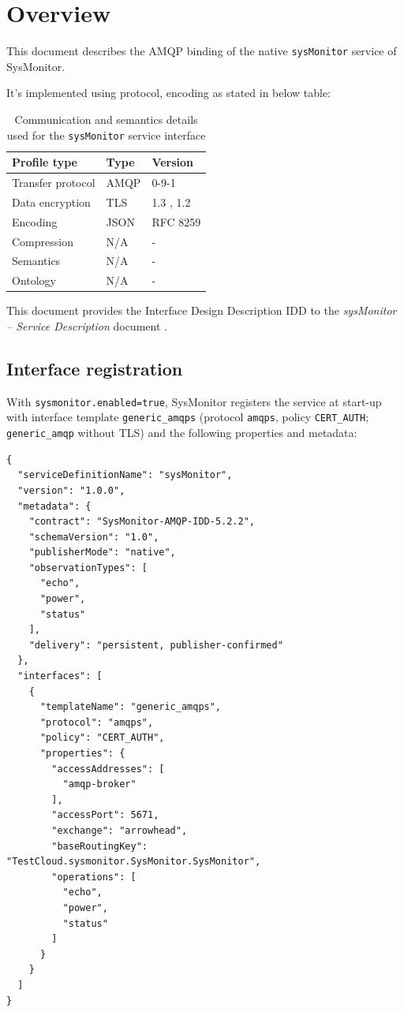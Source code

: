 \documentclass[a4paper]{arrowhead}
\begin{document}
\section{Overview}
\label{sec:overview}

This document describes the AMQP binding of the native \texttt{sysMonitor} service of SysMonitor.

It's implemented using protocol, encoding as stated in below table:
\begin{table}[ht!]
  \centering
  \begin{tabular}{|l|l|l|}
    \hline
    \rowcolor{gray!33} Profile type & Type & Version \\ \hline
    Transfer protocol & AMQP & 0-9-1 \cite{amqp091} \\ \hline
    Data encryption & TLS & 1.3 \cite{rfc8446}, 1.2 \cite{rfc5246} \\ \hline
    Encoding & JSON & RFC 8259 \cite{rfc8259} \\ \hline
    Compression & N/A & - \\ \hline
    Semantics & N/A & - \\ \hline
    Ontology & N/A & - \\ \hline
  \end{tabular}
  \caption{Communication and semantics details used for the \texttt{sysMonitor} service interface}
  \label{tab:comunication_semantics_profile}
\end{table}

This document provides the Interface Design Description IDD to the \textit{sysMonitor -- Service Description} document \cite{smo-sysMonitor-sd}.

\subsection{Interface registration}

With \texttt{sysmonitor.enabled=true}, SysMonitor registers the service at start-up with interface template \texttt{generic\_\allowbreak{}amqps} (protocol \texttt{amqps}, policy \texttt{CERT\_\allowbreak{}AUTH}; \texttt{generic\_\allowbreak{}amqp} without TLS) and the following properties and metadata:

\begin{lstlisting}[caption={Registered service instance (TestCloud).}]
{
  "serviceDefinitionName": "sysMonitor",
  "version": "1.0.0",
  "metadata": {
    "contract": "SysMonitor-AMQP-IDD-5.2.2",
    "schemaVersion": "1.0",
    "publisherMode": "native",
    "observationTypes": [
      "echo",
      "power",
      "status"
    ],
    "delivery": "persistent, publisher-confirmed"
  },
  "interfaces": [
    {
      "templateName": "generic_amqps",
      "protocol": "amqps",
      "policy": "CERT_AUTH",
      "properties": {
        "accessAddresses": [
          "amqp-broker"
        ],
        "accessPort": 5671,
        "exchange": "arrowhead",
        "baseRoutingKey": "TestCloud.sysmonitor.SysMonitor.SysMonitor",
        "operations": [
          "echo",
          "power",
          "status"
        ]
      }
    }
  ]
}
\end{lstlisting}
\end{document}
